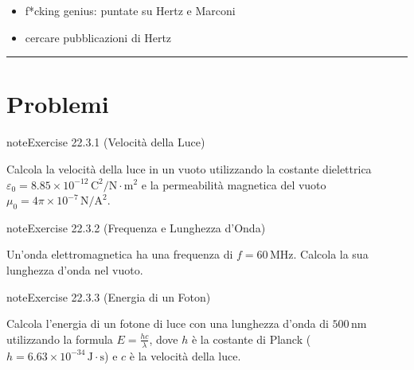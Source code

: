 \documentclass[letterpaper,10pt,italian]{jupyterBook}
\begin{document}
\sphinxAtStartPar
{}
\begin{itemize}
\item {} 
\sphinxAtStartPar
f*cking genius: puntate su Hertz e Marconi

\item {} 
\sphinxAtStartPar
cercare pubblicazioni di Hertz

\end{itemize}


\bigskip\hrule\bigskip


\sphinxstepscope


\section{Problemi}
\label{\detokenize{ch/electromagnetism/em-waves-problems:problemi}}\label{\detokenize{ch/electromagnetism/em-waves-problems:physics-hs-electromagnetism-em-waves-problems}}\label{\detokenize{ch/electromagnetism/em-waves-problems::doc}} \label{exercise:ch/electromagnetism/em-waves-problems-exercise-0}

\begin{sphinxadmonition}{note}{Exercise 22.3.1 (Velocità della Luce)}



\sphinxAtStartPar
Calcola la velocità della luce in un vuoto utilizzando la costante dielettrica \(\varepsilon_0 = 8.85 \times 10^{-12} \, \text{C}^2/\text{N} \cdot \text{m}^2\) e la permeabilità magnetica del vuoto \(\mu_0 = 4\pi \times 10^{-7} \, \text{N}/\text{A}^2\).
\end{sphinxadmonition}
 \label{exercise:ch/electromagnetism/em-waves-problems-exercise-1}

\begin{sphinxadmonition}{note}{Exercise 22.3.2 (Frequenza e Lunghezza d’Onda)}



\sphinxAtStartPar
Un’onda elettromagnetica ha una frequenza di \(f = 60 \, \text{MHz}\). Calcola la sua lunghezza d’onda nel vuoto.
\end{sphinxadmonition}
 \label{exercise:ch/electromagnetism/em-waves-problems-exercise-2}

\begin{sphinxadmonition}{note}{Exercise 22.3.3 (Energia di un Foton)}



\sphinxAtStartPar
Calcola l’energia di un fotone di luce con una lunghezza d’onda di \(500 \, \text{nm}\) utilizzando la formula \(E = \frac{h c}{\lambda}\), dove \(h\) è la costante di Planck (\(h = 6.63 \times 10^{-34} \, \text{J} \cdot \text{s}\)) e \(c\) è la velocità della luce.
\end{sphinxadmonition}
 \label{exercise:ch/electromagnetism/em-waves-problems-exercise-3}
\end{document}
